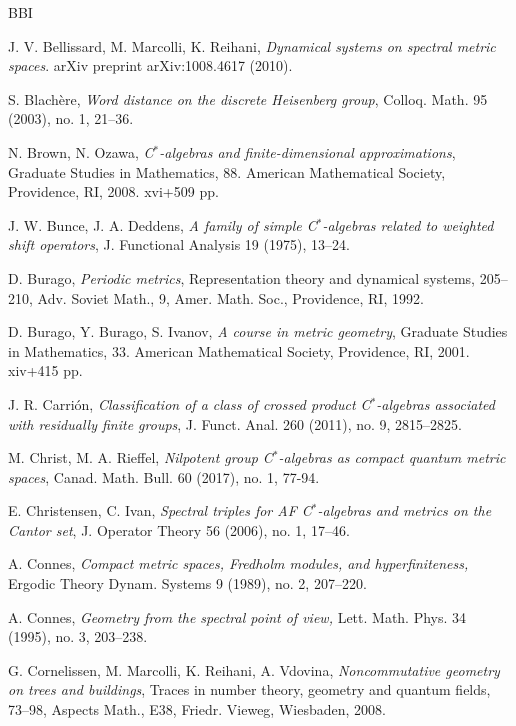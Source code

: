 \documentclass[a4paper,11pt,reqno]{amsart}
\numberwithin{equation}{section}
\numberwithin{equation}{section}
\theoremstyle{definition}
\theoremstyle{remark}
\theoremstyle{remark}
\begin{document}
\begin{thebibliography}{BBI}

 J. V. Bellissard, M. Marcolli, K. Reihani, \emph{Dynamical systems on spectral metric spaces}. arXiv preprint arXiv:1008.4617 (2010).

 S. Blachère, \emph{Word distance on the discrete
Heisenberg group}, Colloq. Math. 95 (2003), no. 1, 21--36.

 N. Brown, N. Ozawa, \emph{C$^{\ast}$-algebras
and finite-dimensional approximations}, Graduate Studies in Mathematics,
88. American Mathematical Society, Providence, RI, 2008. xvi+509 pp.

 J. W. Bunce, J. A. Deddens, \emph{A family of simple
C$^{\ast}$-algebras related to weighted shift operators}, J. Functional
Analysis 19 (1975), 13--24.

 D. Burago, \emph{Periodic metrics}, Representation
theory and dynamical systems, 205--210, Adv. Soviet Math., 9, Amer.
Math. Soc., Providence, RI, 1992.

 D. Burago, Y. Burago, S. Ivanov, \emph{A course
in metric geometry}, Graduate Studies in Mathematics, 33. American
Mathematical Society, Providence, RI, 2001. xiv+415 pp.

 J. R. Carrión, \emph{Classification of a class of crossed
product C$^{\ast}$-algebras associated with residually finite groups},
J. Funct. Anal. 260 (2011), no. 9, 2815--2825.

 M. Christ, M. A. Rieffel, \emph{Nilpotent
group C$^{\ast}$-algebras as compact quantum metric spaces}, Canad.
Math. Bull. 60 (2017), no. 1, 77-94.

 E. Christensen, C. Ivan, \emph{Spectral triples for
AF C$^{\ast}$-algebras and metrics on the Cantor set}, J. Operator
Theory 56 (2006), no. 1, 17--46.

 A. Connes, \emph{Compact metric spaces, Fredholm
modules, and hyperfiniteness,} Ergodic Theory Dynam. Systems 9 (1989),
no. 2, 207--220.

 A. Connes, \emph{Geometry from the spectral point
of view,} Lett. Math. Phys. 34 (1995), no. 3, 203--238.

 G. Cornelissen, M. Marcolli, K. Reihani, A. Vdovina, \emph{Noncommutative geometry on trees and buildings}, Traces in number theory, geometry and quantum fields, 73--98, Aspects Math., E38, Friedr. Vieweg, Wiesbaden, 2008.


\end{thebibliography}
\end{document}
